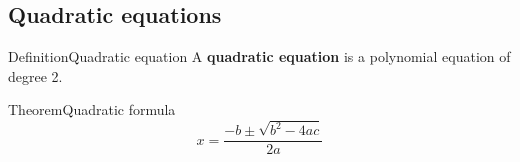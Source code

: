 \documentclass[10pt]{article}
\title{#1}\author{#2}\date{}%
\begin{document}
\begin{clcolumns}

\section*{Quadratic equations}

\begin{cldefinition}{Definition}{Quadratic equation}
A \textbf{quadratic equation} is a polynomial equation of degree 2.

\end{cldefinition}

\begin{cltheorem}{Theorem}{Quadratic formula}
\[
x = \frac{-b \pm \sqrt{b^{2} - 4ac}}{2a}
\]
\end{cltheorem}
\end{clcolumns}
\end{document}
